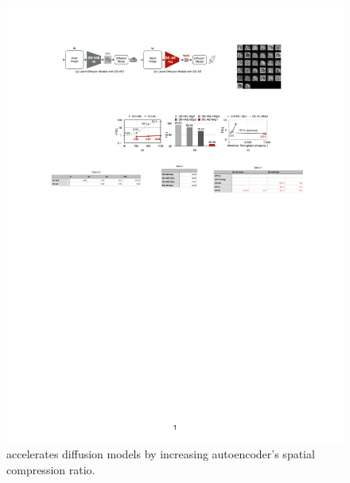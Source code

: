 \begin{figure}[t]
    \centering
    \includegraphics[width=1\linewidth]{figures/src/figure1.pdf}
    \vspace{-15pt}
    \caption{\modelshort accelerates diffusion models by increasing autoencoder's spatial compression ratio.}
    \vspace{-10pt}
    \label{fig:figure1}
\end{figure}

